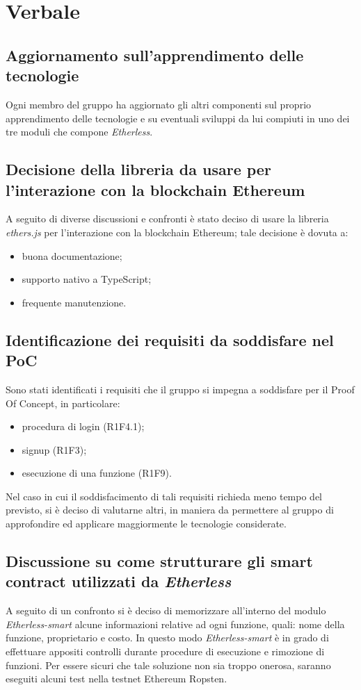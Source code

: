 \section{Verbale}

	\subsection{Aggiornamento sull'apprendimento delle tecnologie}
	Ogni membro del gruppo ha aggiornato gli altri componenti sul proprio apprendimento delle tecnologie e su eventuali sviluppi da lui compiuti in uno dei tre moduli che compone \textit{Etherless}. 
	
	\subsection{Decisione della libreria da usare per l'interazione con la blockchain Ethereum}
	A seguito di diverse discussioni e confronti è stato deciso di usare la libreria \textit{ethers.js} per l'interazione con la blockchain Ethereum; tale decisione è dovuta a: 
		\begin{itemize}
			\item buona documentazione; 
			\item supporto nativo a TypeScript; 
			\item frequente manutenzione. 
		\end{itemize}

	\subsection{Identificazione dei requisiti da soddisfare nel PoC}
	Sono stati identificati i requisiti che il gruppo si impegna a soddisfare per il Proof Of Concept, 
	in particolare: 
		\begin{itemize}
			\item procedura di login (R1F4.1); 
			\item signup (R1F3); 
			\item esecuzione di una funzione (R1F9). 
		\end{itemize}
	Nel caso in cui il soddisfacimento di tali requisiti richieda meno tempo del previsto, si è deciso di valutarne altri, in maniera da permettere al gruppo di approfondire ed applicare maggiormente le tecnologie considerate. 
	
	\subsection{Discussione su come strutturare gli smart contract utilizzati da \textit{Etherless}}
	A seguito di un confronto si è deciso di memorizzare all'interno del modulo \textit{Etherless-smart} alcune informazioni relative ad ogni funzione, quali: nome della funzione, proprietario e costo. In questo modo \textit{Etherless-smart} è in grado di effettuare appositi controlli durante procedure di esecuzione e rimozione di funzioni. 
	Per essere sicuri che tale soluzione non sia troppo onerosa, saranno eseguiti alcuni test nella testnet Ethereum Ropsten. 
	
